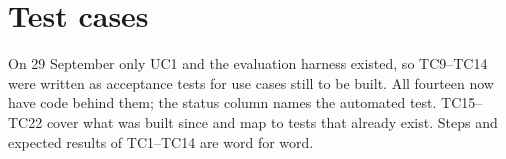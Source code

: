 \section{Test cases}\label{sec:tests}

On 29 September only UC1 and the evaluation harness existed, so TC9--TC14 were written as acceptance tests for use cases still to be built. All fourteen now have code behind them; the status column names the automated test. TC15--TC22 cover what was built since and map to tests that already exist. Steps and expected results of TC1--TC14 are word for word.

\newcommand{\tc}[3]{\textbf{#1}\par\smallskip\textit{Steps:} #2\par\smallskip\textit{Expected:} #3}

\begingroup\renewcommand{\arraystretch}{1.3}\small
